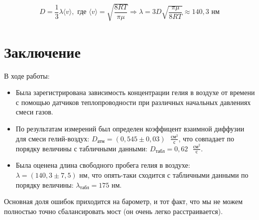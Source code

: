 \documentclass[
a4paper, %
12pt, %
]{article}
\begin{document}
	\begin{align}
		D=\dfrac{1}{3}\lambda\langle v\rangle,\text{ где } \langle v \rangle = \sqrt{\dfrac{8RT}{\pi \mu}} \Rightarrow \lambda = 3D\sqrt{\dfrac{\pi \mu}{8RT}} \approx 140,3\text{ нм}
	\end{align}
	
	
	\section{Заключение}
	В ходе работы:
	
	\begin{itemize}
		\item Была зарегистрирована зависимость концентрации гелия в воздухе от времени с помощью датчиков теплопроводности при различных начальных давлениях смеси газов.
		\item По результатам измерений был определен коэффицент взаимной диффузии для смеси гелий-воздух: $D_\text{атм} = (0,545\pm0,03)\text{ } \frac{\text{см}^2}{\text{с}}$, что совпадает по порядку величины с табличными данными: $D_\text{табл} = 0,62\text{ } \frac{\text{см}^2}{\text{с}}$.
		\item Была оценена длина свободного пробега гелия в воздухе: $\lambda = (140,3\pm7,5)\text{ нм}$, что опять-таки сходится с табличными данными по  порядку величины: $\lambda_\text{табл} = 175\text{ нм}$. 
	\end{itemize}
	Основная доля ошибок приходится на барометр, и тот факт, что мы не можем полностью точно сбалансировать мост (он очень легко расстраивается).
	
\end{document}
